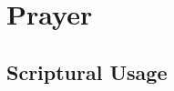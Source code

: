 \section{Prayer}
	\label{PRAYER}
	




	


\subsection{Scriptural Usage} %
	\label{PRAYER-SCRIPTURES}

